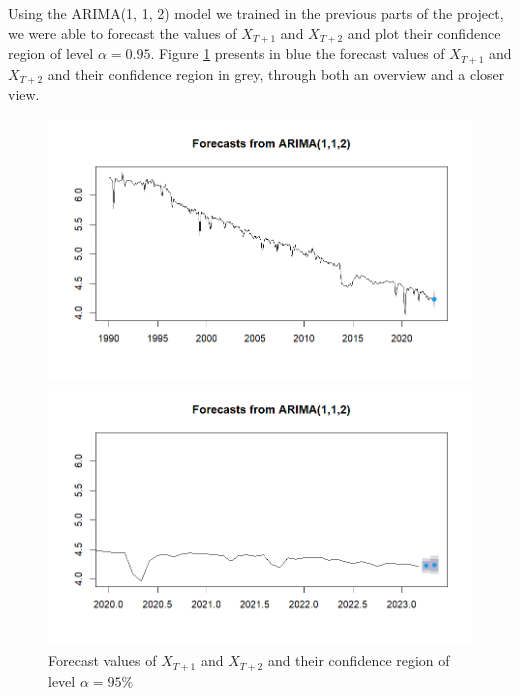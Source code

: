 \documentclass[]{article}
\begin{document}
Using the ARIMA(1, 1, 2) model we trained in the previous parts of the project, we were able to forecast the values of $X_{T+1}$ and $X_{T+2}$ and plot their confidence region of level $\alpha = 0.95$. Figure \ref{forecastSeries} presents in blue the forecast values of $X_{T+1}$ and $X_{T+2}$ and their confidence region in grey, through both an overview and a closer view.
\begin{figure}[!h]
	\centering
	\begin{minipage}{0.45 \linewidth}
		\centering
		\includegraphics[scale=0.4]{forecast.png}
	\end{minipage}
	\hfill
	\begin{minipage}{0.48 \linewidth}
		\centering
		\includegraphics[scale=0.4]{forecast_zoomed.png}
	\end{minipage}
	\caption{Forecast values of $X_{T+1}$ and $X_{T+2}$ and their confidence region of level $\alpha=95\%$}
	\label{forecastSeries}
\end{figure}\\
\end{document}
